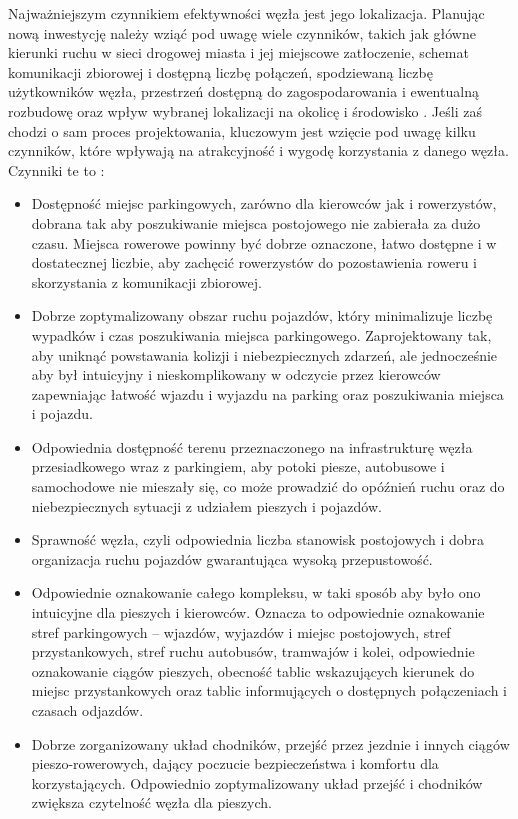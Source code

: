 \documentclass[twoside,12pt]{article}
\begin{document}
	Najważniejszym czynnikiem efektywności węzła jest jego lokalizacja. Planując nową inwestycję należy wziąć pod uwagę wiele czynników, takich jak główne kierunki ruchu w sieci drogowej miasta i jej miejscowe zatłoczenie, schemat komunikacji zbiorowej i dostępną liczbę połączeń, spodziewaną liczbę użytkowników węzła, przestrzeń dostępną do zagospodarowania i ewentualną rozbudowę oraz wpływ wybranej lokalizacji na okolicę i środowisko \cite{icaen}. Jeśli zaś chodzi o sam proces projektowania, kluczowym jest wzięcie pod uwagę kilku czynników, które wpływają na atrakcyjność i wygodę korzystania z danego węzła. Czynniki te to \cite{icaen} \cite{metodyka} \cite{poznan} \cite{kazimierczyk}:
	\begin{itemize}
		\item Dostępność miejsc parkingowych, zarówno dla kierowców jak i rowerzystów, dobrana tak aby poszukiwanie miejsca postojowego nie zabierała za dużo czasu. Miejsca rowerowe powinny być dobrze oznaczone, łatwo dostępne i w dostatecznej liczbie, aby zachęcić rowerzystów do pozostawienia roweru i skorzystania z komunikacji zbiorowej. 
		\item Dobrze zoptymalizowany obszar ruchu pojazdów, który minimalizuje liczbę wypadków i czas poszukiwania miejsca parkingowego. Zaprojektowany tak, aby uniknąć powstawania kolizji i niebezpiecznych zdarzeń, ale jednocześnie aby był intuicyjny i nieskomplikowany w odczycie przez kierowców zapewniając łatwość wjazdu i wyjazdu na parking oraz poszukiwania miejsca i pojazdu.
		\item Odpowiednia dostępność terenu przeznaczonego na infrastrukturę węzła przesiadkowego wraz z parkingiem, aby potoki piesze, autobusowe i samochodowe nie mieszały się, co może prowadzić do opóźnień ruchu oraz do niebezpiecznych sytuacji z udziałem pieszych i pojazdów.
		\item Sprawność węzła, czyli odpowiednia liczba stanowisk postojowych i dobra organizacja ruchu pojazdów gwarantująca wysoką przepustowość.
		\item Odpowiednie oznakowanie całego kompleksu, w taki sposób aby było ono intuicyjne dla pieszych i kierowców. Oznacza to odpowiednie oznakowanie stref parkingowych -- wjazdów, wyjazdów i miejsc postojowych, stref przystankowych, stref ruchu autobusów, tramwajów i kolei, odpowiednie oznakowanie ciągów pieszych, obecność tablic wskazujących kierunek do miejsc przystankowych oraz tablic informujących o dostępnych połączeniach i czasach odjazdów.
		\item Dobrze zorganizowany układ chodników, przejść przez jezdnie i innych ciągów pieszo-rowerowych, dający poczucie bezpieczeństwa i komfortu dla korzystających. Odpowiednio zoptymalizowany układ przejść i chodników zwiększa czytelność węzła dla pieszych.

\end{itemize}
\end{document}
